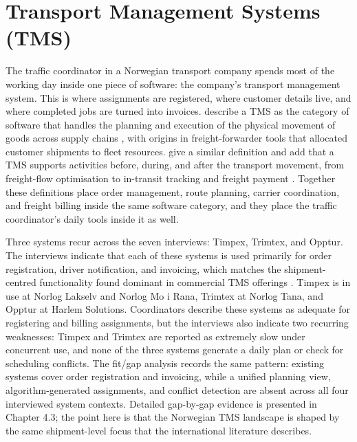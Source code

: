\section{Transport Management Systems (TMS)}
\label{sec:theory:tms}

The traffic coordinator in a Norwegian transport company spends most of the working day inside one piece of software: the company's transport management system. This is where assignments are registered, where customer details live, and where completed jobs are turned into invoices. \textcite{heinbach2022datadriven} describe a TMS as the category of software that handles the planning and execution of the physical movement of goods across supply chains \parencite[p.~811]{heinbach2022datadriven}, with origins in freight-forwarder tools that allocated customer shipments to fleet resources. \textcite{griffis2007tms} give a similar definition and add that a TMS supports activities before, during, and after the transport movement, from freight-flow optimisation to in-transit tracking and freight payment \parencite[p.~19]{griffis2007tms}. Together these definitions place order management, route planning, carrier coordination, and freight billing inside the same software category, and they place the traffic coordinator's daily tools inside it as well.

Three systems recur across the seven interviews: Timpex, Trimtex, and Opptur. The interviews indicate that each of these systems is used primarily for order registration, driver notification, and invoicing, which matches the shipment-centred functionality \textcite{griffis2007tms} found dominant in commercial TMS offerings \parencite[p.~27]{griffis2007tms}. Timpex is in use at Norlog Lakselv and Norlog Mo i Rana, Trimtex at Norlog Tana, and Opptur at Harlem Solutions. Coordinators describe these systems as adequate for registering and billing assignments, but the interviews also indicate two recurring weaknesses: Timpex and Trimtex are reported as extremely slow under concurrent use, and none of the three systems generate a daily plan or check for scheduling conflicts. The fit/gap analysis records the same pattern: existing systems cover order registration and invoicing, while a unified planning view, algorithm-generated assignments, and conflict detection are absent across all four interviewed system contexts. Detailed gap-by-gap evidence is presented in Chapter 4.3; the point here is that the Norwegian TMS landscape is shaped by the same shipment-level focus that the international literature describes.

